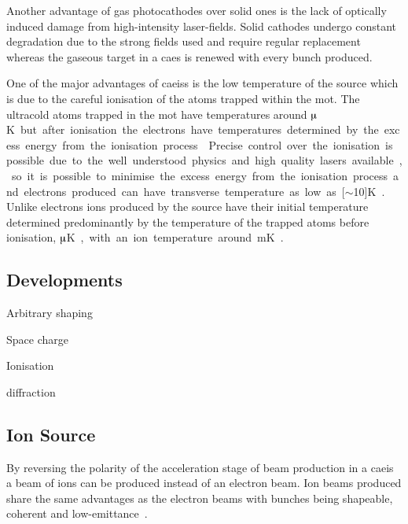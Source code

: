 Another advantage of gas photocathodes over solid ones is the lack of optically induced damage from high-intensity laser-fields.
Solid cathodes undergo constant degradation due to the strong fields used and require regular replacement~\cite{dowell_results_1995} whereas the gaseous target in a \gls{caes} is renewed with every bunch produced.

One of the major advantages of \glspl{caeis} is the low temperature of the source which is due to the careful ionisation of the atoms trapped within the \gls{mot}.
The ultracold atoms trapped in the \gls{mot} have temperatures around \unit[100]{$\muup$K} but after ionisation the electrons have temperatures determined by the excess energy from the ionisation process~\cite{engelen_high-coherence_2013,engelen_analytical_2014,sparkes_high-coherence_2014,speirs_identification_2017}.
Precise control over the ionisation is possible due to the well understood physics and high quality lasers available, so it is possible to minimise the excess energy from the ionisation process and electrons produced can have transverse temperature as low as \unit[$\sim$10]{K}~\cite{saliba_spatial_2012}.
Unlike electrons ions produced by the source have their initial temperature determined predominantly by the temperature of the trapped atoms before ionisation, \unit[100]{$\muup$K}, with an ion temperature around \unit[1]{mK}~\cite{debernardi_measurement_2011,murphy_detailed_2014}.

\subsection{Developments}

Arbitrary shaping~\cite{mcculloch_arbitrarily_2011}

Space charge~\cite{murphy_detailed_2014,murphy_increasing_2015,thompson_suppression_2016}

Ionisation~\cite{speirs_identification_2017}

diffraction~\cite{saliba_spatial_2012,speirs_single-shot_2015}


\subsection{Ion Source}

By reversing the polarity of the acceleration stage of beam production in a \gls{caeis} a beam of ions can be produced instead of an electron beam.
Ion beams produced share the same advantages as the electron beams with bunches being shapeable, coherent and low-emittance~\cite{knuffman_cold_2013}.

